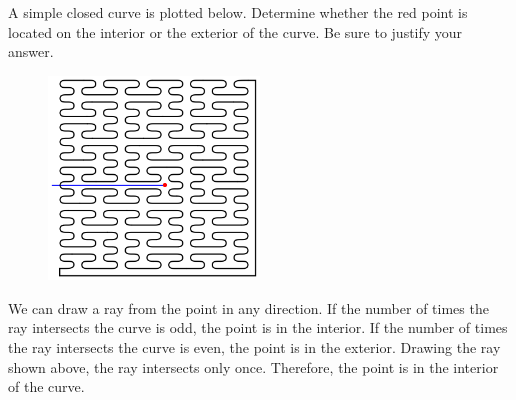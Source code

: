 \documentclass[11pt,letterpaper]{article}
\begin{document}
\newpage



 A simple closed curve is plotted below. Determine whether the red point is located on the interior or the exterior of the curve. Be sure to justify your answer.
	\begin{figure}[!ht]
	\centering
	\includegraphics[width=0.5\textwidth]{peanocurvesol.png}
	\end{figure} \pspace

\sol We can draw a ray from the point in any direction. If the number of times the ray intersects the curve is odd, the point is in the interior. If the number of times the ray intersects the curve is even, the point is in the exterior. Drawing the ray shown above, the ray intersects only once. Therefore, the point is in the interior of the curve. 
\end{document}
